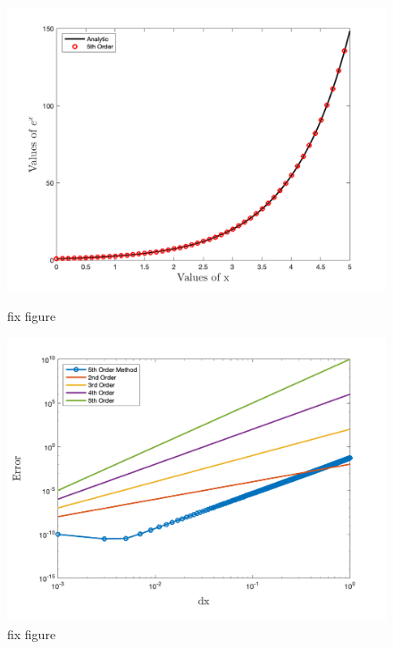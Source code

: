 \begin{figure}[htbp]
	\centering
	\begin{minipage}{.5\textwidth}
		\centering
		\includegraphics[width=1.0\linewidth]{figs/2ndDer.png}
		\caption{fix figure}
		\label{fig:2ndDer}
	\end{minipage}%
	\begin{minipage}{0.5\textwidth}
		\centering
		\includegraphics[width=1.0\linewidth]{figs/2ndErr.png}
		\caption{fix figure}
		\label{fig:2ndErr}
	\end{minipage}
\end{figure}
